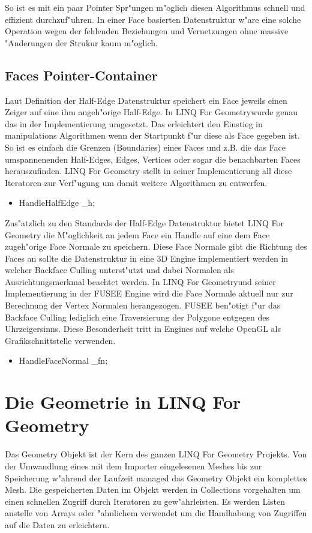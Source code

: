 \documentclass[pagesize, paper=a4, fontsize=12pt,titlepage=true, headings=small, headnosepline, abstractoff, liststotoc, nochapterprefix, plainheadsepline]{scrreprt}
\newcommand{\LFG}{LINQ For Geometry}
\newcommand{\LFGS}{LINQ For Geometry }
\newcommand{\HES}{Half-Edge Datenstruktur }
\begin{document}
So ist es mit ein paar Pointer Spr"ungen m"oglich diesen Algorithmus schnell und effizient durchzuf"uhren. In einer Face basierten Datenstruktur w"are eine solche Operation wegen der fehlenden Beziehungen und Vernetzungen ohne massive "Anderungen der Strukur kaum m"oglich.
		\subsection {Faces Pointer-Container}
			Laut Definition der \HES speichert ein Face jeweils einen Zeiger auf eine ihm angeh"orige Half-Edge. In \LFG wurde genau das in der Implementierung umgesetzt. Das erleichtert den Einstieg in manipulations Algorithmen wenn der Startpunkt f"ur diese als Face gegeben ist. So ist es einfach die Grenzen (Boundaries) eines Faces und z.B. die das Face umspannenenden Half-Edges, Edges, Vertices oder sogar die benachbarten Faces herauszufinden. \LFGS stellt in seiner Implementierung all diese Iteratoren zur Verf"ugung um damit weitere Algorithmen zu entwerfen.

\begin{itemize}
\item HandleHalfEdge \_h;
\end{itemize}

Zus"atzlich zu den Standards der \HES bietet \LFGS die M"oglichkeit an jedem Face ein Handle auf eine dem Face zugeh"orige Face Normale zu speichern. Diese Face Normale gibt die Richtung des Faces an sollte die Datenstruktur in eine 3D Engine implementiert werden in welcher Backface Culling unterst"utzt und dabei Normalen als Ausrichtungsmerkmal beachtet werden. In \LFG und seiner Implementierung in der FUSEE Engine wird die Face Normale aktuell nur zur Berechnung der Vertex Normalen herangezogen. FUSEE ben"otigt f"ur das Backface Culling lediglich eine Traversierung der Polygone entgegen des Uhrzeigersinns. Diese Besonderheit tritt in Engines auf welche OpenGL als Grafikschnittstelle verwenden.
\begin{itemize}
\item HandleFaceNormal \_fn;
\end{itemize}
	\section {Die Geometrie in \LFG}
			Das Geometry Objekt ist der Kern des ganzen \LFGS Projekts. Von der Umwandlung eines mit dem Importer eingelesenen Meshes bis zur Speicherung w"ahrend der Laufzeit managed das Geometry Objekt ein komplettes Mesh. Die gespeicherten Daten im Objekt werden in Collections vorgehalten um einen schnellen Zugriff durch Iteratoren zu gew"ahrleisten. Es werden Listen anstelle von Arrays oder "ahnlichem verwendet um die Handhabung von Zugriffen auf die Daten zu erleichtern.
\end{document}
